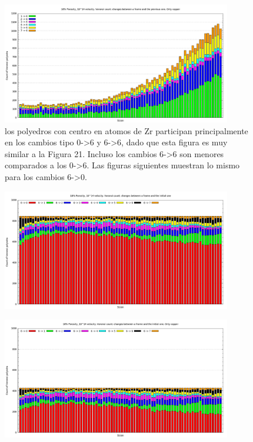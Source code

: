 \documentclass[10pt, oneside]{article} %
\begin{document}
\begin{figure}[H]
\centering
\includegraphics[width=10cm]{Figures/Porosidad/Porosidad_2vel_comp_voronoi_hist13.png}
\caption{los polyedros con centro en atomos de Zr participan principalmente en los cambios tipo 0->6 y 6->6, dado que esta figura es muy similar a la Figura 21. Incluso los cambios 6->6 son menores comparados a los 0->6. Las figuras siguientes muestran lo mismo para los cambios 6->0.}
\end{figure}

\begin{figure}[H]
\centering
\includegraphics[width=10cm]{Figures/Porosidad/Porosidad_2vel_comp_voronoi_hist14.png}
\caption{}
\end{figure}

\begin{figure}[H]
\centering
\includegraphics[width=10cm]{Figures/Porosidad/Porosidad_2vel_comp_voronoi_hist15.png}
\caption{}
\end{figure}
\end{document}
